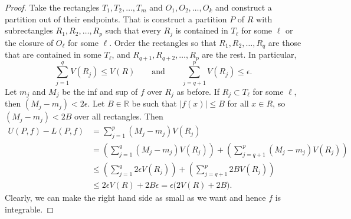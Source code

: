 \documentclass[12pt]{book}
\newcommand{\abs}[1]{\left\lvert {#1} \right\rvert}
\newcommand{\R}{{\mathbb{R}}}
\theoremstyle{plain}
\theoremstyle{remark}
\theoremstyle{definition}
\theoremstyle{exercise}
\theoremstyle{example}
\begin{document}
\begin{proof}
Take the rectangles $T_1,T_2,\ldots,T_m$ and $O_1,O_2,\ldots,O_k$
and construct a partition out of their endpoints.  That is construct
a partition $P$ of $R$ with subrectangles $R_1,R_2,\ldots,R_p$
such that every $R_j$ is contained in $T_\ell$ for some $\ell$
or the closure of $O_\ell$ for some $\ell$.  Order
the rectangles so that $R_1,R_2,\ldots,R_q$ are those
that are contained in some $T_\ell$, and $R_{q+1},R_{q+2},\ldots,R_{p}$
are the rest.
In particular,
\begin{equation*}
\sum_{j=1}^q V(R_j) \leq V(R)
\qquad \text{and} \qquad
\sum_{j=q+1}^p V(R_j) \leq \epsilon .
\end{equation*}
Let $m_j$ and $M_j$ be the inf and sup
of $f$
over $R_j$ as before.
If $R_j \subset T_\ell$ for some $\ell$, then $(M_j-m_j) < 2 \epsilon$.
Let $B \in \R$ be such that
$\abs{f(x)} \leq B$ for all $x \in R$, so $(M_j-m_j) < 2B$ over all
rectangles. Then
\begin{equation*}
\begin{split}
U(P,f)-L(P,f)
& =
\sum_{j=1}^p (M_j-m_j) V(R_j)
\\
& =
\left(
\sum_{j=1}^q (M_j-m_j) V(R_j)
\right)
+
\left(
\sum_{j=q+1}^p (M_j-m_j) V(R_j)
\right)
\\
& \leq
\left(
\sum_{j=1}^q 2\epsilon V(R_j)
\right)
+
\left(
\sum_{j=q+1}^p 2 B V(R_j)
\right)
\\
& \leq
2 \epsilon V(R)
+
2B \epsilon = \epsilon \bigl(2V(R)+2B\bigr) .
\end{split}
\end{equation*}
Clearly, we can make the right hand side as small as we want
and hence $f$ is integrable.


\end{proof}
\end{document}
